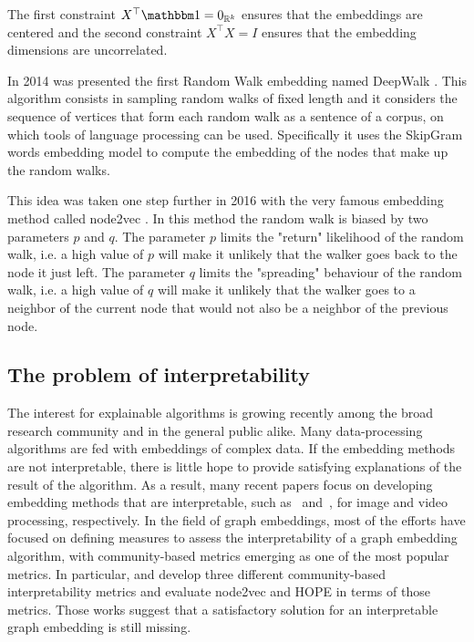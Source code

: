 The first constraint $X^\top \ones = \zeros{\realset^k}$ ensures that the embeddings are centered and the second constraint $X^\top X = I$ ensures that the embedding dimensions are uncorrelated.

In 2014 was presented the first Random Walk embedding named DeepWalk \cite{perozzi2014_DeepWalkOnlineLearning}. This algorithm consists in sampling random walks of fixed length and it considers the sequence of vertices that form each random walk as a sentence of a corpus, on which tools of language processing can be used. Specifically it uses the SkipGram words embedding model to compute the embedding of the nodes that make up the random walks.

This idea was taken one step further in 2016 with the very famous embedding method called node2vec \cite{groverNode2vecScalableFeature2016}. In this method the random walk is biased by two parameters $p$ and $q$. The parameter $p$ limits the "return" likelihood of the random walk, i.e. a high value of $p$ will make it unlikely that the walker goes back to the node it just left. The parameter $q$ limits the "spreading" behaviour of the random walk, i.e. a high value of $q$ will make it unlikely that the walker goes to a neighbor of the current node that would not also be a neighbor of the previous node.



\subsection{The problem of interpretability}\label{subsec:interpretability_explained}
The interest for explainable algorithms is growing recently among the broad research community and in the general public alike. Many data-processing algorithms are fed with embeddings of complex data. If the embedding methods are not interpretable, there is little hope to provide satisfying explanations of the result of the algorithm. As a result, many recent papers focus on developing embedding methods that are interpretable, such as~\cite{example_interpr_lee_2021} and~\cite{example_interpr_wu_2020}, for image and video processing, respectively.
In the field of graph embeddings, most of the efforts have focused on defining measures to assess the interpretability of a graph embedding algorithm, with community-based metrics emerging as one of the most popular metrics. In particular, \cite{khoshraftar2021} and \cite{gogoglou_2019} develop three different community-based interpretability metrics and evaluate node2vec and HOPE in terms of those metrics. Those works suggest that a satisfactory solution for an interpretable graph embedding is still missing. %

